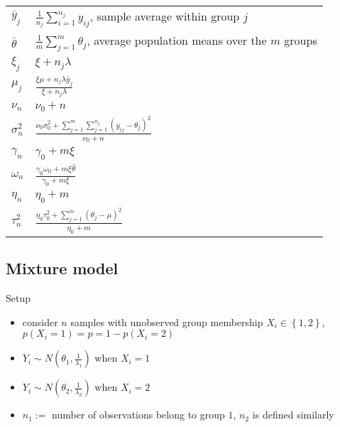     \begin{tabulary}{\linewidth}{l @{ = } L}
        $\bar{y}_j$ & $\frac{1}{n_j}\sum_{i=1}^{n_j}
        y_{ij}$, sample average within group $j$\\
        $\bar{\theta}$ & $\frac{1}{m}\sum_{j=1}^m \theta_j$,
        average population means over the $m$ groups\\
        $\xi_j$ & $\xi + n_j\lambda$\\
        $\mu_j$ & $\frac{\xi\mu + n_j\lambda\bar{y}_j}
        {\xi+n_j\lambda}$\\
        $\nu_n$ & $\nu_0 + n$\\
        $\sigma_n^2$ & $\frac{\nu_0\sigma_0^2 +
        \sum_{j=1}^m\sum_{j=1}^{n_j} (y_{ij}-\theta_j)^2}
        {\nu_0+n}$\\
        $\gamma_n$ & $\gamma_0 + m\xi$\\
        $\omega_n$ & $\frac{\gamma_0\omega_0 + m\xi\bar{\theta}}
        {\gamma_0 + m\xi}$\\
        $\eta_n$ & $\eta_0 + m$\\
        $\tau_n^2$ & $\frac{\eta_0\tau_0^2 + \sum_{j=1}^m
        (\theta_j - \mu)^2}{\eta_0+m}$
    \end{tabulary}

    \subsection{Mixture model}

    Setup
    \begin{itemize}
        \item consider $n$ samples with unobserved group membership
            $X_i\in\left\{ 1, 2 \right\}$, $p(X_i = 1) = p = 1 -
            p(X_i = 2)$
        \item $Y_i \sim N(\theta_1,
            \frac{1}{\lambda_1})$
            when $X_i = 1$
        \item $Y_i \sim N(\theta_2,
            \frac{1}{\lambda_2})$ when $X_i = 2$
        \item $n_1:=$ number of observations belong to group
            $1$, $n_2$ is defined similarly
    \end{itemize}

